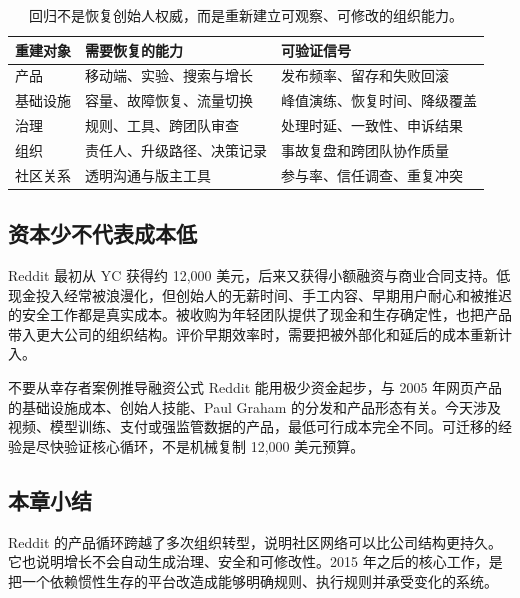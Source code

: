 \begin{table}[H]
\centering
\begin{tabular}{L{0.2\textwidth}L{0.34\textwidth}L{0.36\textwidth}}
\toprule
重建对象 & 需要恢复的能力 & 可验证信号 \\
\midrule
产品 & 移动端、实验、搜索与增长 & 发布频率、留存和失败回滚 \\
基础设施 & 容量、故障恢复、流量切换 & 峰值演练、恢复时间、降级覆盖 \\
治理 & 规则、工具、跨团队审查 & 处理时延、一致性、申诉结果 \\
组织 & 责任人、升级路径、决策记录 & 事故复盘和跨团队协作质量 \\
社区关系 & 透明沟通与版主工具 & 参与率、信任调查、重复冲突 \\
\bottomrule
\end{tabular}
\caption{回归不是恢复创始人权威，而是重新建立可观察、可修改的组织能力。}
\end{table}

\subsection{资本少不代表成本低}

Reddit 最初从 YC 获得约 12,000 美元，后来又获得小额融资与商业合同支持。低现金投入经常被浪漫化，但创始人的无薪时间、手工内容、早期用户耐心和被推迟的安全工作都是真实成本。被收购为年轻团队提供了现金和生存确定性，也把产品带入更大公司的组织结构。评价早期效率时，需要把被外部化和延后的成本重新计入。

\begin{warningbox}{不要从幸存者案例推导融资公式}
Reddit 能用极少资金起步，与 2005 年网页产品的基础设施成本、创始人技能、Paul Graham 的分发和产品形态有关。今天涉及视频、模型训练、支付或强监管数据的产品，最低可行成本完全不同。可迁移的经验是尽快验证核心循环，不是机械复制 12,000 美元预算。
\end{warningbox}

\subsection{本章小结}

Reddit 的产品循环跨越了多次组织转型，说明社区网络可以比公司结构更持久。它也说明增长不会自动生成治理、安全和可修改性。2015 年之后的核心工作，是把一个依赖惯性生存的平台改造成能够明确规则、执行规则并承受变化的系统。

